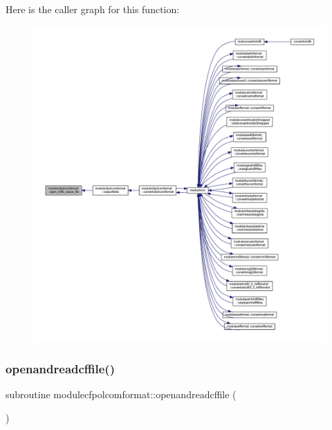 Here is the caller graph for this function\+:\nopagebreak
\begin{figure}[H]
\begin{center}
\leavevmode
\includegraphics[width=350pt]{namespacemodulecfpolcomformat_aa08f9068cb50c9ebecda0e3eac54124c_icgraph}
\end{center}
\end{figure}
\mbox{\label{namespacemodulecfpolcomformat_a4b22d491cfb2a95ce7441773203c2e7e}} 
\subsubsection{\texorpdfstring{openandreadcffile()}{openandreadcffile()}}
{\footnotesize\ttfamily subroutine modulecfpolcomformat\+::openandreadcffile (\begin{DoxyParamCaption}{ }\end{DoxyParamCaption})\hspace{0.3cm}{\ttfamily [private]}}

